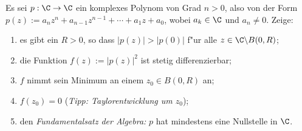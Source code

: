 \begin{prob}
Es sei $p:\C\to\C$ ein komplexes Polynom von Grad $n>0$, also von der Form $p(z):=a_nz^n+a_{n-1}z^{n-1}+\cdots+a_1z+a_0$, wobei $a_k\in\C$ und $a_n\neq 0$. Zeige:
\begin{enumerate}[label=(\alph*)]
\item es gibt ein $R>0$, so dass $|p(z)|>|p(0)|$ f"ur alle $z\in \C\backslash B(0,R)$;
\item die Funktion $f(z):=|p(z)|^2$ ist stetig differenzierbar;
\item $f$ nimmt sein Minimum an einem $z_0\in B(0,R)$ an;
\item $f(z_0)=0$ ({\em Tipp: Taylorentwicklung um $z_0$});
\item den \emph{Fundamentalsatz der Algebra:} $p$ hat mindestens eine Nullstelle in $\C$.
\end{enumerate}
\end{prob}
